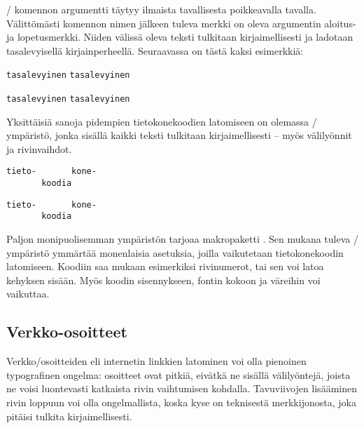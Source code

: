 \-/ komennon argumentti täytyy ilmaista tavallisesta
poikkeavalla tavalla. Välittömästi komennon nimen jälkeen tuleva merkki
on oleva argumentin aloitus- ja lopetusmerkki. Niiden välissä oleva
teksti tulkitaan kirjaimellisesti ja ladotaan tasalevyisellä
kirjainperheellä. Seuraavassa on tästä kaksi esimerkkiä:

\begin{koodilohkosis}
\verb.tasalevyinen.   %
\verb|tasalevyinen|   %
\end{koodilohkosis}

\begin{tulossis}
  \verb.tasalevyinen.
  \verb|tasalevyinen|
\end{tulossis}

Yksittäisiä sanoja pidempien tietokonekoodien latomiseen on olemassa
\-/ ympäristö, jonka sisällä kaikki teksti
tulkitaan kirjaimellisesti -- myös välilyönnit ja rivinvaihdot.

\begin{koodilohkosis}
\begin{verbatim}
tieto-       kone-
       koodia
\end{verbatim}
\end{koodilohkosis}

\begin{tulossis}
\begin{verbatim}
tieto-       kone-
       koodia
\end{verbatim}
\end{tulossis}

Paljon monipuolisemman ympäristön tarjoaa makropaketti
. Sen mukana tuleva
\-/ ympäristö ymmärtää monenlaisia asetuksia,
joilla vaikutetaan tietokonekoodin latomiseen. Koodiin saa mukaan
esimerkiksi rivinumerot, tai sen voi latoa kehyksen sisään. Myös koodin
sisennykseen, fontin kokoon ja väreihin voi vaikuttaa.

\subsection{Verkko-osoitteet}

Verkko\-/osoitteiden eli internetin linkkien latominen voi olla
pienoinen typografinen ongelma: osoitteet ovat pitkiä, eivätkä ne
sisällä välilyöntejä, joista ne voisi luontevasti katkaista rivin
vaihtumisen kohdalla. Tavuviivojen lisääminen rivin loppuun voi olla
ongelmallista, koska kyse on teknisestä merkkijonosta, joka pitäisi
tulkita kirjaimellisesti.

